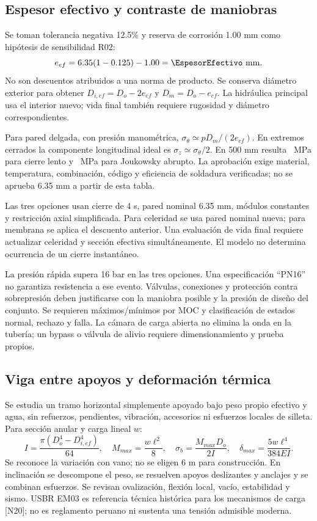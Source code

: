 \subsection{Espesor efectivo y contraste de maniobras}
Se toman tolerancia negativa 12.5\% y reserva de corrosión 1.00 mm como hipótesis de sensibilidad R02:
\[
e_{ef}=6.35(1-0.125)-1.00=\EspesorEfectivo\ \mathrm{mm}.
\]
No son descuentos atribuidos a una norma de producto. Se conserva diámetro exterior para obtener $D_{i,ef}=D_o-2e_{ef}$ y $D_m=D_o-e_{ef}$. La hidráulica principal usa el interior nuevo; vida final también requiere rugosidad y diámetro correspondientes.

Para pared delgada, con presión manométrica, $\sigma_\theta\simeq pD_m/(2e_{ef})$. En extremos cerrados la componente longitudinal ideal es $\sigma_z\simeq\sigma_\theta/2$. En 500 mm resulta \SigmaLenta\ MPa para cierre lento y \SigmaRapida\ MPa para Joukowsky abrupto. La aprobación exige material, temperatura, combinación, código y eficiencia de soldadura verificadas; no se aprueba 6.35 mm a partir de esta tabla.

\small\normalsize
Las tres opciones usan cierre de 4 s, pared nominal 6.35 mm, módulos constantes y restricción axial simplificada. Para celeridad se usa pared nominal nueva; para membrana se aplica el descuento anterior. Una evaluación de vida final requiere actualizar celeridad y sección efectiva simultáneamente. El modelo no determina ocurrencia de un cierre instantáneo.

La presión rápida supera 16 bar en las tres opciones. Una especificación ``PN16'' no garantiza resistencia a ese evento. Válvulas, conexiones y protección contra sobrepresión deben justificarse con la maniobra posible y la presión de diseño del conjunto. Se requieren máximos/mínimos por MOC y clasificación de estados normal, rechazo y falla. La cámara de carga abierta no elimina la onda en la tubería; un bypass o válvula de alivio requiere dimensionamiento y prueba propios.

\subsection{Viga entre apoyos y deformación térmica}
Se estudia un tramo horizontal simplemente apoyado bajo peso propio efectivo y agua, sin refuerzos, pendientes, vibración, accesorios ni esfuerzos locales de silleta. Para sección anular y carga lineal $w$:
\[
I=\frac{\pi(D_o^4-D_{i,ef}^4)}{64},\quad
M_{max}=\frac{w\ell^2}{8},\quad
\sigma_b=\frac{M_{max}D_o}{2I},\quad
\delta_{max}=\frac{5w\ell^4}{384EI}.
\]
\small\normalsize
Se reconoce la variación con vano; no se eligen 6 m para construcción. En inclinación se descompone el peso, se resuelven apoyos deslizantes y anclajes y se combinan esfuerzos. Se revisan ovalización, flexión local, vacío, estabilidad y sismo. USBR EM03 es referencia técnica histórica para los mecanismos de carga [N20]; no es reglamento peruano ni sustenta una tensión admisible moderna.

